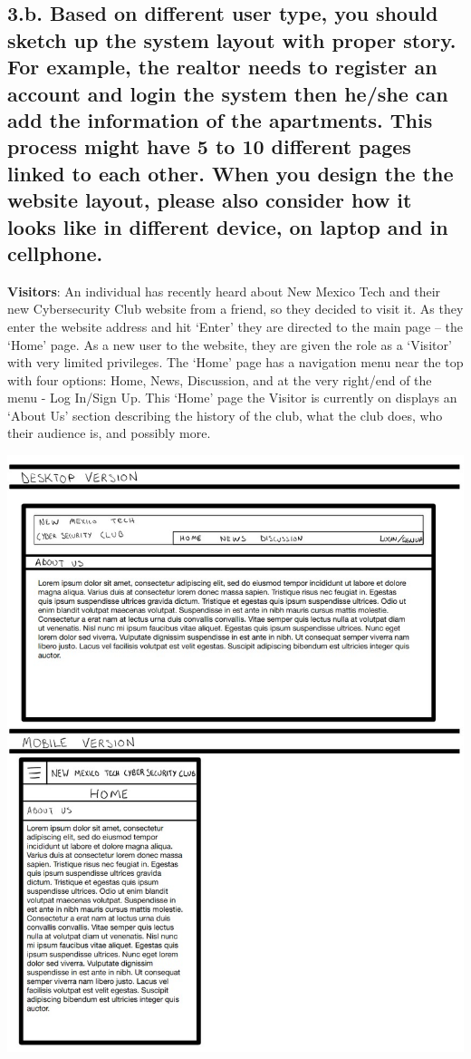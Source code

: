 \documentclass{article}
\begin{document}
\subsection{  3.b. Based on different user type, you should sketch up the system layout with proper story. For example, the realtor needs to register an account and login the system then he/she can add the information of the apartments. This process might have 5 to 10 different pages linked to each other. When you design the the website layout, please also consider how it looks like in different device, on laptop and in cellphone.}
\textbf{Visitors}: An individual has recently heard about New Mexico Tech and their new Cybersecurity Club website from a friend, so they decided to visit it.  As they enter the website address and hit ‘Enter’ they are directed to the main page – the ‘Home’ page.  As a new user to the website, they are given the role as a ‘Visitor’ with very limited privileges.  The ‘Home’ page has a navigation menu near the top with four options: Home, News, Discussion, and at the very right/end of the menu - Log In/Sign Up.  This ‘Home’ page the Visitor is currently on displays an ‘About Us’ section describing the history of the club, what the club does, who their audience is, and possibly more.
\par
\includegraphics[scale=0.60]{visitor_1.jpg}
\end{document}
